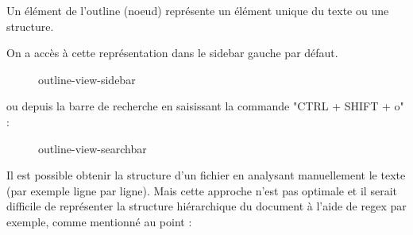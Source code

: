 \documentclass[
    iict, %
    il, %
]{heig-tb}
\begin{document}
Un élément de l'outline (noeud) représente un élément unique du texte ou une structure.

On a accès à cette représentation dans le sidebar gauche par défaut.

\begin{figure}[!h]
    \begin{center}
    \end{center}
    \caption[outline-view-sidebar]{\label{outline-view-sidebar} outline-view-sidebar}
\end{figure}

ou depuis la barre de recherche en saisissant la commande "CTRL + SHIFT + o" :

\begin{figure}[!h]
    \begin{center}
    \end{center}
    \caption[outline-view-searchbar]{\label{outline-view-searchbar} outline-view-searchbar}
\end{figure}

Il est possible obtenir la structure d'un fichier en analysant manuellement le texte (par exemple ligne par ligne).
Mais cette approche n'est pas optimale et il serait difficile de représenter la structure hiérarchique du document à l'aide de regex par exemple,
comme mentionné au point : %
\end{document}
